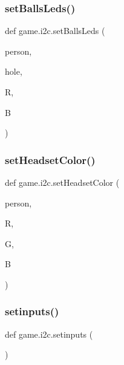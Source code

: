 \subsubsection{\texorpdfstring{set\+Balls\+Leds()}{setBallsLeds()}}
{\footnotesize\ttfamily def game.\+i2c.\+set\+Balls\+Leds (\begin{DoxyParamCaption}\item[{}]{person,  }\item[{}]{hole,  }\item[{}]{R,  }\item[{}]{B }\end{DoxyParamCaption})}

\hypertarget{namespacegame_1_1i2c_a2988a923a2bb6a9d2f4c8e7409e0aded}{}\label{namespacegame_1_1i2c_a2988a923a2bb6a9d2f4c8e7409e0aded} 
\subsubsection{\texorpdfstring{set\+Headset\+Color()}{setHeadsetColor()}}
{\footnotesize\ttfamily def game.\+i2c.\+set\+Headset\+Color (\begin{DoxyParamCaption}\item[{}]{person,  }\item[{}]{R,  }\item[{}]{G,  }\item[{}]{B }\end{DoxyParamCaption})}

\hypertarget{namespacegame_1_1i2c_a1d5b4aed68be231c5ca8d1611701a17c}{}\label{namespacegame_1_1i2c_a1d5b4aed68be231c5ca8d1611701a17c} 
\subsubsection{\texorpdfstring{setinputs()}{setinputs()}}
{\footnotesize\ttfamily def game.\+i2c.\+setinputs (\begin{DoxyParamCaption}{ }\end{DoxyParamCaption})}

\hypertarget{namespacegame_1_1i2c_ae885c09ef1646e179bf8b880fbb284a6}{}\label{namespacegame_1_1i2c_ae885c09ef1646e179bf8b880fbb284a6} 

